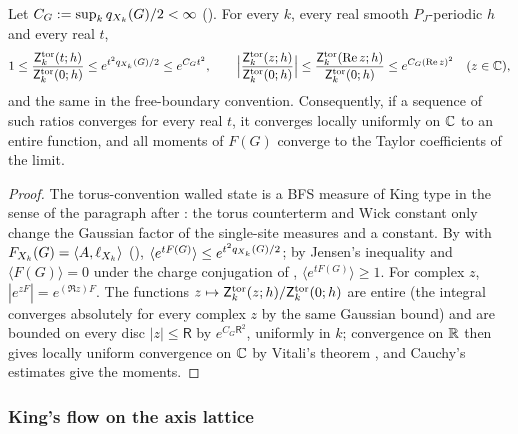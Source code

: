 \begin{lemma}\label{rot:lem:H6A}
Let $C_G:=\sup_kq_{X_k}(G)/2<\infty$ (). For every $k$, every real smooth $P_J$-periodic $h$ and every real $t$,
\[
1\le\frac{\mathsf Z^{\rm tor}_k(t;h)}{\mathsf Z^{\rm tor}_k(0;h)}\le e^{t^2q_{X_k}(G)/2}\le e^{C_Gt^2},\qquad\Big|\frac{\mathsf Z^{\rm tor}_k(z;h)}{\mathsf Z^{\rm tor}_k(0;h)}\Big|\le\frac{\mathsf Z^{\rm tor}_k(\operatorname{Re} z;h)}{\mathsf Z^{\rm tor}_k(0;h)}\le e^{C_G(\operatorname{Re} z)^2}\quad(z\in\mathbb C),
\]
and the same in the free-boundary convention. Consequently, if a sequence of such ratios converges for every real $t$, it converges locally uniformly on $\mathbb C$ to an entire function, and all moments of $F(G)$ converge to the Taylor coefficients of the limit.
\end{lemma}
\begin{proof}
The torus-convention walled state is a BFS measure of King type in the sense of the paragraph after : the torus counterterm and Wick constant only change the Gaussian factor of the single-site measures and a constant. By  with $F_{X_k}(G)=\langle A,\ell_{X_k}\rangle$ (), $\langle e^{tF(G)}\rangle\le e^{t^2q_{X_k}(G)/2}$; by Jensen's inequality and $\langle F(G)\rangle=0$ under the charge conjugation of , $\langle e^{tF(G)}\rangle\ge1$. For complex $z$, $|e^{zF}|=e^{(\Re z)F}$. The functions $z\mapsto\mathsf Z^{\rm tor}_k(z;h)/\mathsf Z^{\rm tor}_k(0;h)$ are entire (the integral converges absolutely for every complex $z$ by the same Gaussian bound) and are bounded on every disc $|z|\le\mathsf R$ by $e^{C_G\mathsf R^2}$, uniformly in $k$; convergence on $\mathbb R$ then gives locally uniform convergence on $\mathbb C$ by Vitali's theorem \cite{Hor90}, and Cauchy's estimates give the moments.
\end{proof}

\subsubsection*{King's flow on the axis lattice}


